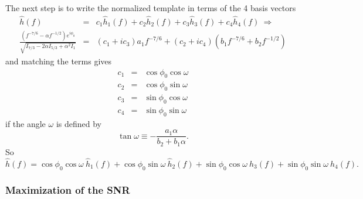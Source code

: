 The next step is to write the normalized template in terms of the 4 basis 
vectors
\begin{eqnarray}
\hat{h}(f) &=& c_1 \hat{h}_1(f) + c_2 \hat{h}_2(f) + c_3 \hat{h}_3(f) +
	c_4 \hat{h}_4(f) \: \Rightarrow \\
\frac{(f^{-7/6} - \alpha f^{-1/2}) e^{i \phi_0}}{\sqrt{I_{7/3} - 2 \alpha 
	I_{5/3} + \alpha^2 I_1}} &=& (c_1 +i c_3) a_1 f^{-7/6} +  
	(c_2 + i c_4) (b_1 f^{-7/6} + b_2 f^{-1/2} )
\end{eqnarray}
and matching the terms gives
\begin{eqnarray}
c_1 &=& \cos\phi_0 \cos\omega \\
c_2 &=& \cos\phi_0 \sin\omega \\
c_3 &=& \sin\phi_0 \cos\omega \\
c_4 &=& \sin\phi_0 \sin\omega
\end{eqnarray}
if the angle $\omega$ is defined by
\begin{equation}
\tan\omega \equiv - \frac{a_1 \alpha}{b_2 + b_1 \alpha}.
\end{equation}
So
\begin{equation}
\hat{h}(f) = \cos\phi_0 \cos\omega \:\hat{h}_1(f) + 
	     \cos\phi_0 \sin\omega \:\hat{h}_2(f) + 
	     \sin\phi_0 \cos\omega \:\hat{h}_3(f) +
	     \sin\phi_0 \sin\omega \:\hat{h}_4(f).
\end{equation}

\subsubsection*{Maximization of the SNR}
\label{SNRMaximization}

